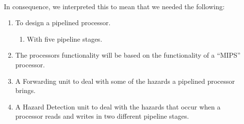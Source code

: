 \paragraph*{}
In consequence, we interpreted this to mean that we needed the following:
\begin{enumerate}
	\item To design a pipelined processor.
	\begin{enumerate}
		\item With five pipeline stages.
	\end{enumerate}
	\item The processors functionality will be based on the functionality of a
``MIPS'' processor.
	\item A Forwarding unit to deal with some of the hazards a pipelined
processor brings.
	\item A Hazard Detection unit to deal with the hazards that occur when a
processor reads and writes in two different pipeline stages.
\end{enumerate}
